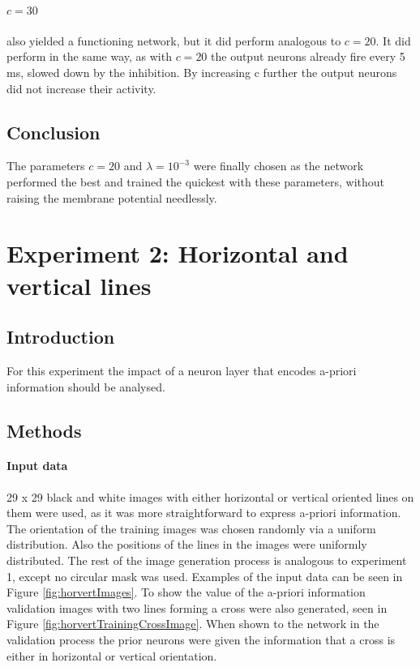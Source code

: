 \paragraph{$c = 30$}
also yielded a functioning network, but it did perform analogous to $c = 20$. It did perform in the same way, as with $c = 20$ the output neurons already fire every 5 ms, slowed down by the inhibition. By increasing c further the output neurons did not increase their activity.

\subsection{Conclusion}

The parameters $c = 20$ and $\lambda = 10^{-3}$ were finally chosen as the network performed the best and trained the quickest with these parameters, without raising the membrane potential needlessly.

\section{Experiment 2: Horizontal and vertical lines}

\subsection{Introduction}

For this experiment the impact of a neuron layer that encodes a-priori information should be analysed.

\subsection{Methods}

\paragraph{Input data}
29 x 29 black and white images with either horizontal or vertical oriented lines on them were used, as it was more straightforward to express a-priori information. The orientation of the training images was chosen randomly via a uniform distribution. Also the positions of the lines in the images were uniformly distributed. The rest of the image generation process is analogous to experiment 1, except no circular mask was used. Examples of the input data can be seen in Figure \ref{fig:horvertImages}. To show the value of the a-priori information validation images with two lines forming a cross were also generated, seen in Figure \ref{fig:horvertTrainingCrossImage}. When shown to the network in the validation process the prior neurons were given the information that a cross is either in horizontal or vertical orientation.

